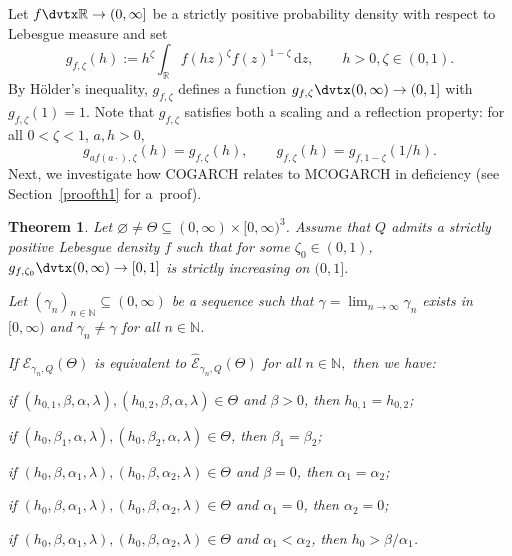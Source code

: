 \documentclass[number,citesort,seceqn,dvips]{arxbj}
\newtheorem{theorem}{Theorem}[section]
\newcommand{\RR}{\mathbb{R}}
\newcommand{\NN}{\mathbb{N}}
\newcommand{\EEE}{{\mathcal E}}
\begin{document}
Let $f\dvtx\RR\to(0,\infty]$ be a strictly positive probability density
with respect to Lebesgue measure and set
%
\begin{equation}\label{defgQz}
g_{f, \zeta}(h):=h^\zeta  \int_\RR
f(hz)^\zeta f(z)^{1-\zeta}\,\mathrm{d}z,\qquad  h>0 , \zeta\in(0,1).
\end{equation}
%
By H\"{o}lder's inequality, $g_{f, \zeta}$ defines a function
$g_{f,\zeta}\dvtx(0,\infty)\to(0,1]$ with $g_{f,\zeta}(1)=1$. Note that
$g_{f, \zeta}$ satisfies both a scaling and a reflection property: for
all $0<\zeta<1$, $a,h>0$,
%
\begin{equation}\label{gfzscalingrefl}
g_{af(a\cdot), \zeta}(h)=g_{f, \zeta}(h),\qquad
g_{f, \zeta}(h)=g_{f, 1 - \zeta}(1/h).
\end{equation}
%
Next, we
investigate how COGARCH relates to MCOGARCH in deficiency (see
Section~\ref{proofth1} for a~proof).
%
\begin{theorem}\label{th1}
Let $\varnothing\neq\Theta\subseteq
(0,\infty)\times[0,\infty)^3$.
Assume that $Q$ admits a strictly positive Lebesgue density $f$ such
that for some $\zeta_0\in(0,1)$, $g_{f, \zeta_0}\dvtx(0,\infty)\to[0,1]$
is strictly increasing on $(0,1]$.

Let $(\gamma_n)_{n\in\NN}\subseteq(0,\infty)$ be a sequence such that
$\gamma=\lim_{n\to\infty} \gamma_n$ exists in $[0,\infty)$ and
$\gamma_n\neq\gamma$ for all $n\in\NN$.

If $\EEE_{\gamma_n,Q}(\Theta)$ is equivalent to
$\widehat\EEE_{\gamma_n,Q}(\Theta)$ for all $n\in\NN,$ then we
have:
\begin{longlist}
\item   if
$(h_{0,1},\beta,\alpha,\lambda),(h_{0,2},\beta,\alpha,\lambda)\in
\Theta$ and $\beta>0$, then $h_{0,1}= h_{0,2}$;
\item   if
$(h_{0},\beta_1,\alpha,\lambda),(h_{0},\beta_2,\alpha,\lambda)\in
\Theta$, then $\beta_{1}= \beta_{2}$;
\item   if
$(h_{0},\beta,\alpha_1,\lambda),(h_{0},\beta,\alpha_2,\lambda)\in
\Theta$ and $\beta=0$, then $\alpha_1=\alpha_{2}$;\vadjust{\goodbreak}
\item  if
$(h_{0},\beta,\alpha_1,\lambda),(h_{0},\beta,\alpha_2,\lambda)\in
\Theta$ and $\alpha_1=0$, then $\alpha_{2}=0$;
\item   if
$(h_{0},\beta,\alpha_1,\lambda),(h_{0},\beta,\alpha_2,\lambda)\in
\Theta$
and $\alpha_1<\alpha_2$, then $h_0>\beta/\alpha_{1}$.
\end{longlist}
\end{theorem}
\end{document}
